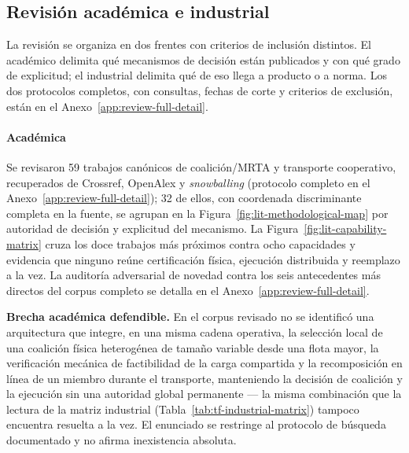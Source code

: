 \subsection{Revisión académica e industrial}
\label{subsec:tf-discriminant}

La revisión se organiza en dos frentes con criterios de inclusión distintos. El
académico delimita qué mecanismos de decisión están publicados y con qué grado
de explicitud; el industrial delimita qué de eso llega a producto o a norma. Los
dos protocolos completos, con consultas, fechas de corte y criterios de
exclusión, están en el Anexo~\ref{app:review-full-detail}.

\paragraph{Académica}
Se revisaron 59 trabajos canónicos de coalición/MRTA y transporte cooperativo,
recuperados de Crossref, OpenAlex y \emph{snowballing} (protocolo completo en
el Anexo~\ref{app:review-full-detail}); 32 de ellos, con coordenada
discriminante completa en la fuente, se agrupan en la
Figura~\ref{fig:lit-methodological-map} por autoridad de decisión y
explicitud del mecanismo. La Figura~\ref{fig:lit-capability-matrix} cruza los
doce trabajos más próximos contra ocho capacidades y evidencia que ninguno
reúne certificación física, ejecución distribuida y reemplazo a la vez. La
auditoría adversarial de novedad contra los seis antecedentes más directos
del corpus completo se detalla en el Anexo~\ref{app:review-full-detail}.




\begin{tcolorbox}[enhanced,breakable,colback=VIUOrange!5,colframe=VIUOrange,
  boxrule=0.45pt,leftrule=2.8pt,arc=1.2mm,left=2.5mm,right=2.5mm,top=1.8mm,bottom=1.8mm]
\textbf{Brecha académica defendible.} En el corpus revisado no se identificó una
arquitectura que integre, en una misma cadena operativa, la selección local de una
coalición física heterogénea de tamaño variable desde una flota mayor, la verificación
mecánica de factibilidad de la carga compartida y la recomposición en línea de un
miembro durante el transporte, manteniendo la decisión de coalición y la ejecución sin
una autoridad global permanente --- la misma combinación que la lectura de la matriz
industrial (Tabla~\ref{tab:tf-industrial-matrix}) tampoco encuentra resuelta a la vez. El
enunciado se restringe al protocolo de búsqueda documentado y no afirma inexistencia
absoluta.
\end{tcolorbox}


